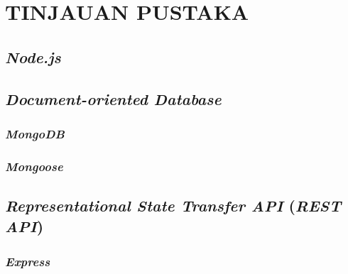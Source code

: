 \chapter{TINJAUAN PUSTAKA}
\vspace{4ex}

\setlength{\parindent}{7ex}


\section{\emph{Node.js}}
\vspace{1ex}

\lipsum[1]
\vspace{0.5ex}

\section{\emph{Document-oriented Database}}
\vspace{1ex}

\lipsum[2]
\vspace{0.5ex}

\subsection{\emph{MongoDB}}
\vspace{1ex}

\lipsum[3]
\vspace{0.5ex}

\subsection{\emph{Mongoose}}
\vspace{1ex}

\lipsum[4]
\vspace{0.5ex}

\section{\emph{Representational State Transfer API} (\emph{REST API})}
\vspace{1ex}

\lipsum[5]
\vspace{0.5ex}

\subsection{\emph{Express}}
\vspace{1ex}

